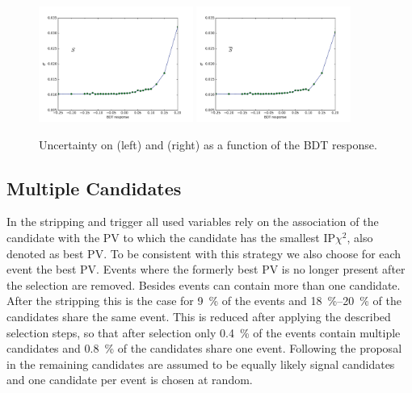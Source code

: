 \begin{figure}[tbp]
    \centering
    \includegraphics[width=0.45\textwidth]{06selection/figs/sensitiv_Sf.pdf}
    \includegraphics[width=0.45\textwidth]{06selection/figs/sensitiv_Sfbar.pdf}
    \caption{Uncertainty on \Sf (left) and \Sfbar (right) as a function of the \ac{BDT} response.}
    \label{fig:BDTopt}
\end{figure}

\subsection{Multiple Candidates}
\label{sec:MultCands}

In the stripping and trigger all used variables rely on the association of the \Bz candidate with the \ac{PV} to which the candidate has the smallest $\text{IP}\chi^2$, also denoted as best \ac{PV}.
To be consistent with this strategy we also choose for each event the best \ac{PV}.
Events where the formerly best \ac{PV} is no longer present after the selection are removed.
Besides events can contain more than one \Bz candidate.
After the stripping this is the case for \SI{9}{\percent} of the events and \SIrange{18}{20}{\percent} of the \Bz candidates share the same event.
This is reduced after applying the described selection steps, so that after selection only \SI{0.4}{\percent} of the events contain multiple candidates and \SI{0.8}{\percent} of the \Bz candidates share one event.
Following the proposal in \cite{Koppenburg:2017zsh} the remaining candidates are assumed to be equally likely signal candidates and one candidate per event is chosen at random.


